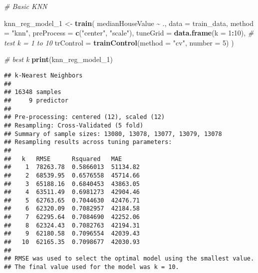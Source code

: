 \documentclass[
]{article}
\newenvironment{Shaded}{\begin{snugshade}}{\end{snugshade}}
\newcommand{\AttributeTok}[1]{\textcolor[rgb]{0.13,0.29,0.53}{#1}}
\newcommand{\CommentTok}[1]{\textcolor[rgb]{0.56,0.35,0.01}{\textit{#1}}}
\newcommand{\DecValTok}[1]{\textcolor[rgb]{0.00,0.00,0.81}{#1}}
\newcommand{\FunctionTok}[1]{\textcolor[rgb]{0.13,0.29,0.53}{\textbf{#1}}}
\newcommand{\NormalTok}[1]{#1}
\newcommand{\OtherTok}[1]{\textcolor[rgb]{0.56,0.35,0.01}{#1}}
\newcommand{\SpecialCharTok}[1]{\textcolor[rgb]{0.81,0.36,0.00}{\textbf{#1}}}
\newcommand{\StringTok}[1]{\textcolor[rgb]{0.31,0.60,0.02}{#1}}
\begin{document}
\begin{Shaded}
\begin{Highlighting}[]
\CommentTok{\# Basic KNN}

\NormalTok{knn\_reg\_model\_1 }\OtherTok{\textless{}{-}} \FunctionTok{train}\NormalTok{(}
\NormalTok{  medianHouseValue }\SpecialCharTok{\textasciitilde{}}\NormalTok{ ., }
  \AttributeTok{data =}\NormalTok{ train\_data,}
  \AttributeTok{method =} \StringTok{"knn"}\NormalTok{,}
  \AttributeTok{preProcess =} \FunctionTok{c}\NormalTok{(}\StringTok{"center"}\NormalTok{, }\StringTok{"scale"}\NormalTok{),}
  \AttributeTok{tuneGrid =} \FunctionTok{data.frame}\NormalTok{(}\AttributeTok{k =} \DecValTok{1}\SpecialCharTok{:}\DecValTok{10}\NormalTok{),  }\CommentTok{\# test k = 1 to 10}
  \AttributeTok{trControl =} \FunctionTok{trainControl}\NormalTok{(}\AttributeTok{method =} \StringTok{"cv"}\NormalTok{, }\AttributeTok{number =} \DecValTok{5}\NormalTok{) }
\NormalTok{) }

\CommentTok{\# best k }
\FunctionTok{print}\NormalTok{(knn\_reg\_model\_1)}
\end{Highlighting}
\end{Shaded}

\begin{verbatim}
## k-Nearest Neighbors 
## 
## 16348 samples
##     9 predictor
## 
## Pre-processing: centered (12), scaled (12) 
## Resampling: Cross-Validated (5 fold) 
## Summary of sample sizes: 13080, 13078, 13077, 13079, 13078 
## Resampling results across tuning parameters:
## 
##   k   RMSE      Rsquared   MAE     
##    1  78263.78  0.5866013  51134.82
##    2  68539.95  0.6576558  45714.66
##    3  65188.16  0.6840453  43863.05
##    4  63511.49  0.6981273  42904.46
##    5  62763.65  0.7044630  42476.71
##    6  62320.09  0.7082957  42184.58
##    7  62295.64  0.7084690  42252.06
##    8  62324.43  0.7082763  42194.31
##    9  62180.58  0.7096554  42039.43
##   10  62165.35  0.7098677  42030.93
## 
## RMSE was used to select the optimal model using the smallest value.
## The final value used for the model was k = 10.
\end{verbatim}

\begin{Shaded}
\end{Shaded}
\end{document}
